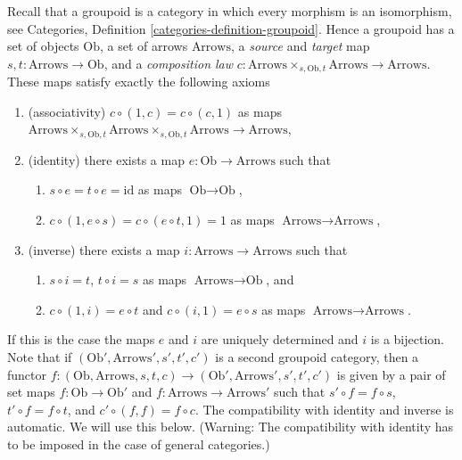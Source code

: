 \noindent
Recall that a groupoid is a category in which every morphism
is an isomorphism, see
Categories, Definition \ref{categories-definition-groupoid}.
Hence a groupoid has a set of objects $\text{Ob}$,
a set of arrows $\text{Arrows}$, a {\it source} and {\it target}
map $s, t : \text{Arrows} \to \text{Ob}$, and a {\it composition law}
$c : \text{Arrows} \times_{s, \text{Ob}, t} \text{Arrows}
\to \text{Arrows}$.
These maps satisfy exactly the following axioms
\begin{enumerate}
\item (associativity) $c \circ (1, c) = c \circ (c, 1)$ as maps
$\text{Arrows} \times_{s, \text{Ob}, t}
\text{Arrows} \times_{s, \text{Ob}, t}
\text{Arrows} \to \text{Arrows}$,
\item (identity) there exists a map $e : \text{Ob} \to \text{Arrows}$
such that
\begin{enumerate}
\item $s \circ e = t \circ e = \text{id}$ as maps $\text{Ob} \to \text{Ob}$,
\item $c \circ (1, e \circ s) = c \circ (e \circ t, 1) = 1$
as maps $\text{Arrows} \to \text{Arrows}$,
\end{enumerate}
\item (inverse) there exists a map $i : \text{Arrows} \to \text{Arrows}$
such that
\begin{enumerate}
\item $s \circ i = t$, $t \circ i = s$ as maps $\text{Arrows} \to \text{Ob}$,
and
\item $c \circ (1, i) = e \circ t$ and $c \circ (i, 1) = e \circ s$
as maps $\text{Arrows} \to \text{Arrows}$.
\end{enumerate}
\end{enumerate}
If this is the case the maps $e$ and $i$ are uniquely determined and
$i$ is a bijection. Note that if $(\text{Ob}', \text{Arrows}', s', t', c')$
is a second groupoid category, then a functor
$f : (\text{Ob}, \text{Arrows}, s, t, c) \to
(\text{Ob}', \text{Arrows}', s', t', c')$
is given by a pair of set maps $f : \text{Ob} \to \text{Ob}'$ and
$f : \text{Arrows} \to \text{Arrows}'$ such that
$s' \circ f = f \circ s$, $t' \circ f = f \circ t$, and
$c' \circ (f, f) = f \circ c$. The compatibility with identity and
inverse is automatic. We will use this below.
(Warning: The compatibility with identity
has to be imposed in the case of general categories.)


